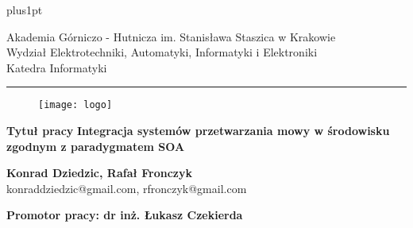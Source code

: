 \documentclass[a4paper, twoside,11pt, openright]{Latex/Classes/PhDthesisPSnPDF}
\begin{document}
\def\tablename{Tabela}
\def\listtablename{Spis tabel}%


\renewcommand\baselinestretch{1.2}
\baselineskip=18pt plus1pt




\thispagestyle{empty}

\begin{center}
Akademia Górniczo - Hutnicza im. Stanisława Staszica w Krakowie \\
Wydział Elektrotechniki, Automatyki, Informatyki i Elektroniki \\
Katedra Informatyki
\rule{\textwidth}{.1mm}
\end{center}

\begin{figure}[hkp!]
 \centering
 \texttt{[image: logo]}
 \label{fig:orzel_agh}
\end{figure}

\begin{center}
{\bf \large Tytuł pracy}
\vskip 10pt
{\bf \Large Integracja systemów przetwarzania mowy w środowisku zgodnym z paradygmatem SOA}
\end{center}

\vskip 60pt
\begin{center}
{\Large \bf Konrad Dziedzic, Rafał Fronczyk}\\
{konraddziedzic@gmail.com, rfronczyk@gmail.com}
\end{center}

\vskip 50pt
\begin{center}
{\bf
    Promotor pracy: dr inż. Łukasz Czekierda
}
\end{center}
\end{document}
